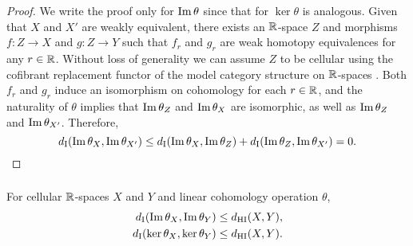 \begin{proof}
	We write the proof only for $\operatorname{Im}\theta$ since that for $\ker\theta$ is analogous.
	Given that $X$ and $X'$ are weakly equivalent, there exists an $\mathbb{R}$-space $Z$ and morphisms $f \colon Z \to X$ and $g \colon Z \to Y$ such that $f_r$ and $g_r$ are weak homotopy equivalences for any $r \in \mathbb{R}$.
	Without loss of generality we can assume $Z$ to be cellular using the cofibrant replacement functor of the model category structure on $\mathbb{R}$-spaces \cite{blumberg2023interleaving}.
    Both $f_r$ and $g_r$ induce an isomorphism on cohomology for each $r \in \mathbb{R}$, and the naturality of $\theta$ implies that $\operatorname{Im}\theta_{Z}$ and $\operatorname{Im}\theta_{X}$ are isomorphic, as well as $\operatorname{Im}\theta_{Z}$ and $\operatorname{Im}\theta_{X'}$. 
	Therefore,
	\[
	d_{\mathrm{I}}(\operatorname{Im}\theta_{X},\operatorname{Im}\theta_{X'}) \leq
	d_{\mathrm{I}}(\operatorname{Im}\theta_{X},\operatorname{Im}\theta_{Z}) + d_{\mathrm{I}}(\operatorname{Im}\theta_{Z},\operatorname{Im}\theta_{X'}) =
	0.\qedhere
	\]
\end{proof}

\subsubsection{}\label{thm:theta stability}

\theorem
For cellular $\mathbb{R}$-spaces $X$ and $Y$ and linear cohomology operation $\theta$,
\begin{align*}
	d_{\mathrm{I}}(\operatorname{Im}\theta_{X}, \operatorname{Im}\theta_{Y}) &\leq d_{\mathrm{HI}}(X,Y), \\
	d_{\mathrm{I}}(\ker\theta_{X}, \ker\theta_{Y}) &\leq d_{\mathrm{HI}}(X,Y).
\end{align*}

